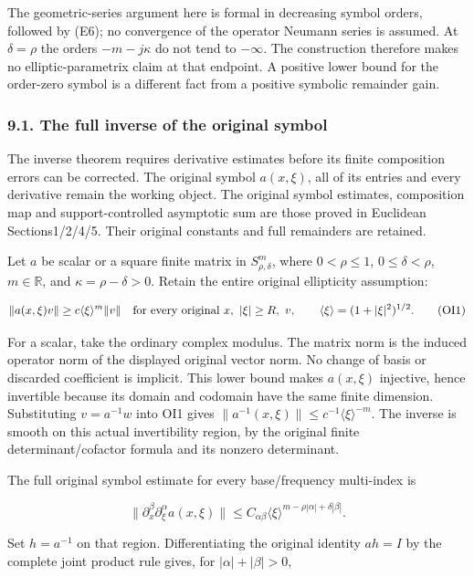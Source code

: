 \documentclass[
  11pt,
]{article}
\begin{document}
The geometric-series argument here is formal in decreasing symbol
orders, followed by (E6); no convergence of the operator Neumann series
is assumed. At \(\delta=\rho\) the orders \(-m-j\kappa\) do not tend to
\(-\infty\). The construction therefore makes no elliptic-parametrix
claim at that endpoint. A positive lower bound for the order-zero symbol
is a different fact from a positive symbolic remainder gain.

\subsubsection{9.1. The full inverse of the original
symbol}\label{the-full-inverse-of-the-original-symbol}

The inverse theorem requires derivative estimates before its finite
composition errors can be corrected. The original symbol \(a(x,\xi)\),
all of its entries and every derivative remain the working object. The
original symbol estimates, composition map and support-controlled
asymptotic sum are those proved in Euclidean Sections1/2/4/5. Their
original constants and full remainders are retained.

Let \(a\) be scalar or a square finite matrix in \(S^m_{\rho,\delta}\),
where \(0<\rho\leq1\), \(0\leq\delta<\rho\), \(m\in\mathbb R\), and
\(\kappa=\rho-\delta>0\). Retain the entire original ellipticity
assumption:

\[
\|a(x,\xi)v\|\geq c\langle\xi\rangle^m\|v\|
\quad\hbox{for every original }x,\ |\xi|\geq R,\ v,
\qquad\langle\xi\rangle=(1+|\xi|^2)^{1/2}.
\tag{OI1}
\]

For a scalar, take the ordinary complex modulus. The matrix norm is the
induced operator norm of the displayed original vector norm. No change
of basis or discarded coefficient is implicit. This lower bound makes
\(a(x,\xi)\) injective, hence invertible because its domain and codomain
have the same finite dimension. Substituting \(v=a^{-1}w\) into OI1
gives \(\|a^{-1}(x,\xi)\|\leq c^{-1}\langle\xi\rangle^{-m}\). The
inverse is smooth on this actual invertibility region, by the original
finite determinant/cofactor formula and its nonzero determinant.

The full original symbol estimate for every base/frequency multi-index
is

\[
\|\partial_x^\beta\partial_\xi^\alpha a(x,\xi)\|
\leq C_{\alpha\beta}
\langle\xi\rangle^{m-\rho|\alpha|+\delta|\beta|}.
\tag{OI2}
\]

Set \(h=a^{-1}\) on that region. Differentiating the original identity
\(ah=I\) by the complete joint product rule gives, for
\(|\alpha|+|\beta|>0\),
\end{document}
